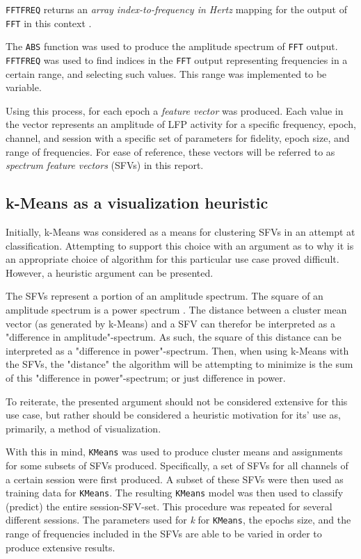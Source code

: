 \documentclass{article}
\begin{document}
\texttt{FFTFREQ} returns an \textit{array index-to-frequency in Hertz} mapping for the output of \texttt{FFT} in this context \citep{numpy}.

The \texttt{ABS} function was used to produce the amplitude spectrum of \texttt{FFT} output. 
\texttt{FFTFREQ} was used to find indices in the \texttt{FFT} output representing frequencies in a certain range, and selecting such values.
This range was implemented to be variable.

Using this process, for each epoch a \textit{feature vector} was produced. 
Each value in the vector represents an amplitude of LFP activity for a specific frequency, epoch, channel, and session with a specific set of parameters for fidelity, epoch size, and range of frequencies.
For ease of reference, these vectors will be referred to as \textit{spectrum feature vectors} (SFVs) in this report.

\subsection{k-Means as a visualization heuristic}\label{KM Method}

Initially, k-Means was considered as a means for clustering SFVs in an attempt at classification. 
Attempting to support this choice with an argument as to why it is an appropriate choice of algorithm for this particular use case proved difficult.
However, a heuristic argument can be presented.

The SFVs represent a portion of an amplitude spectrum. 
The square of an amplitude spectrum is a power spectrum \citep{numpy}.
The distance between a cluster mean vector (as generated by k-Means) and a SFV can therefor be interpreted as a "difference in amplitude"-spectrum.
As such, the square of this distance can be interpreted as a "difference in power"-spectrum.
Then, when using k-Means with the SFVs, the "distance" the algorithm will be attempting to minimize is the sum of this "difference in power"-spectrum; or just difference in power.

To reiterate, the presented argument should not be considered extensive for this use case, but rather should be considered a heuristic motivation for its' use as, primarily, a method of visualization.

With this in mind, \texttt{KMeans} was used to produce cluster means and assignments for some subsets of SFVs produced.
Specifically, a set of SFVs for all channels of a certain session were first produced.
A subset of these SFVs were then used as training data for \texttt{KMeans}.
The resulting \texttt{KMeans} model was then used to classify (predict) the entire session-SFV-set.
This procedure was repeated for several different sessions.
The parameters used for \textit{k} for \texttt{KMeans}, the epochs size, and the range of frequencies included in the SFVs are able to be varied in order to produce extensive results. 
\end{document}
